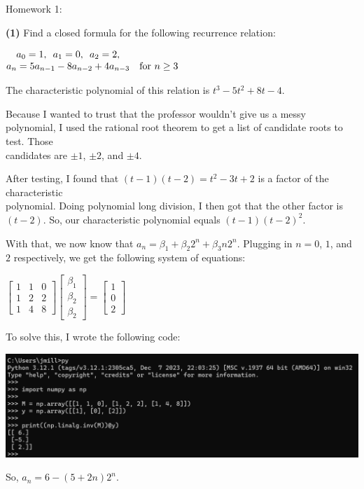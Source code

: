 \documentclass{book}
\newcommand{\hOne}{%
   \color{Black}%
   \fontsize{14}{16}\selectfont%
}
\newcommand{\exOne}{%
   \color{Purple}%
   \fontsize{13}{15}\selectfont%
}
\newenvironment{myIndent}{%
   \begin{adjustwidth}{2.5em}{0em}%
}{%
   \end{adjustwidth}%
}
\newcommand{\blab}[1]{\textbf{#1}}
\newcommand{\myHS}{ \hspace{0.5em}}
\newcommand{\retTwo}{\hfill\bigbreak}
\newcommand{\mHeader}[1]{{
   \color{Black}%
   \fontsize{20}{18}\selectfont%
   #1\retTwo
}}
\begin{document}
\newpage
\phantom{a}
\newpage

\hOne
\mHeader{Homework 1:}

\blab{(1)} Find a closed formula for the following recurrence relation:

{\centering 
$\begin{matrix}
   a_0 = 1,\myHS a_1 = 0,\myHS a_2 = 2,\\
   a_n = 5a_{n-1} - 8a_{n-2} + 4a_{n-3} & \text{for } n \geq 3
\end{matrix}$ \retTwo\par}

\begin{myIndent}\exOne
   The characteristic polynomial of this relation is $t^3 - 5t^2 + 8t - 4$.\retTwo

   Because I wanted to trust that the professor wouldn't give us a messy polynomial, I used the rational root theorem to get a list of candidate roots to test. Those\\ candidates are $\pm 1$, $\pm 2$, and $\pm 4$.\retTwo

   After testing, I found that $(t - 1)(t - 2) = t^2 - 3t + 2$ is a factor of the characteristic\\ polynomial. Doing polynomial long division, I then got that the other factor is\\ $(t - 2)$. So, our characteristic polynomial equals $(t - 1)(t - 2)^2$.\retTwo

   With that, we now know that $a_n = \beta_1 + \beta_2 2^n + \beta_3 n 2^n$. Plugging in $n = 0$, $1$, and $2$ respectively, we get the following system of equations:
   
   {\center $
   \begin{bmatrix}
      1 & 1 & 0 \\ 1 & 2 & 2 \\ 1 & 4 & 8
   \end{bmatrix}
   \begin{bmatrix}
      \beta_1 \\ \beta_2 \\ \beta_2
   \end{bmatrix} = 
   \begin{bmatrix}
      1 \\ 0 \\ 2
   \end{bmatrix}$ \retTwo\par}

   To solve this, I wrote the following code:

   {\centering\includegraphics[scale=0.6]{188-HW1_Q1.png}\retTwo\par}

   So, $a_n = 6 - (5 + 2n)2^n$.\retTwo
\end{myIndent}
\end{document}
